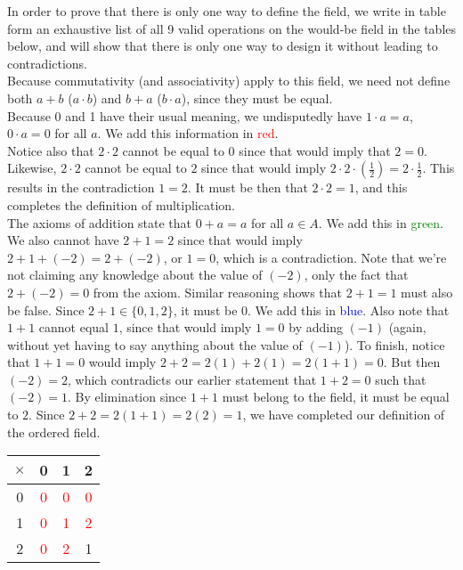 \documentclass[11 pt]{article}
\begin{document}
\begin{solution}
	In order to prove that there is only one way to define the field, we write in table form an exhaustive list of all 9 valid operations on the would-be field in the tables below, and will show that there is only one way to design it without leading to contradictions.\\
	Because commutativity (and associativity) apply to this field, we need not define both $a+b$ ($a\cdot b$) and $b+a$ ($b\cdot a$), since they must be equal.\\
	Because 0 and 1 have their usual meaning, we undisputedly have $1\cdot a=a$, $0\cdot a=0$ for all $a$. We add this information in \textcolor{red}{red}.\\
	Notice also that $2\cdot2$ cannot be equal to 0 since that would imply that $2=0$. Likewise, $2\cdot2$ cannot be equal to $2$ since that would imply $2\cdot2\cdot(\frac{1}{2})=2\cdot\frac{1}{2}$. This results in the contradiction $1=2$. It must be then that  $2\cdot2=1$, and this completes the definition of multiplication.\\
	The axioms of addition state that $0+a=a$ for all $a\in A$. We add this in \textcolor{green}{green}.\\
	We also cannot have $2+1=2$ since that would imply $2+1+(-2)=2+(-2)$, or $1=0$, which is a contradiction. Note that we're not claiming any knowledge about the value of $(-2)$, only the fact that $2+(-2)=0$ from the axiom. Similar reasoning shows that $2+1=1$ must also be false. Since  $2+1 \in \{0,1,2\}$, it must be 0. We add this in \textcolor{blue}{blue}.
	Also note that $1+1$ cannot equal $1$, since that would imply  $1=0$ by adding  $(-1)$ (again, without yet having to say anything about the value of $(-1)$).
	To finish, notice that $1+1=0$ would imply $2+2=2(1)+2(1)=2(1+1)=0$. But then $(-2)=2$, which contradicts our earlier statement that $1+2=0$ such that $(-2)=1$.
	By elimination since $1+1$ must belong to the field, it must be equal to $2$. Since  $2+2=2(1+1)=2(2)=1$, we have completed our definition of the ordered field.\\
	\begin{center}
	\begin{tabular}{c||c|c|c}
		$\times$ & 0 & 1 & 2\\
\hline\hline
		0 &\textcolor{red}{0} &\textcolor{red}{0} &\textcolor{red}{0}\\
		\hline
		1 &\textcolor{red}{0}&\textcolor{red}{1}  &\textcolor{red}{2}\\
		\hline
		2 &\textcolor{red}{0}&\textcolor{red}{2}  &1\\
		\hline
	\end{tabular}


\end{center}
\end{solution}
\end{document}
